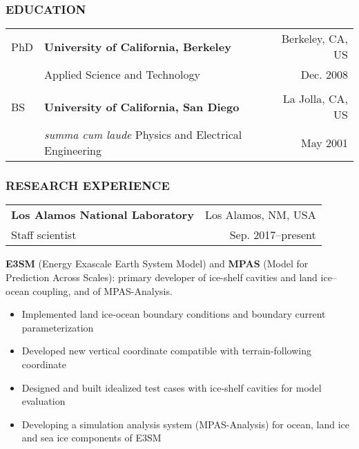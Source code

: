 \documentclass[12pt,letterpaper]{article}
\begin{document}
\begin{flushleft}
\subsubsection*{\color{titleBlue} EDUCATION}

\begin{tabularx}{\textwidth}{@{}  l X r @{} }
PhD & {\bf University of California, Berkeley} & Berkeley, CA, US\\
& Applied Science and Technology & Dec. 2008 \\
\\
BS & {\bf University of California, San Diego} & La Jolla, CA, US \\
& {\it summa cum laude} Physics and Electrical Engineering & May 2001\\
\end{tabularx}

\subsubsection*{\color{titleBlue} RESEARCH EXPERIENCE}

\begin{tabularx}{\textwidth}{@{} X r @{}}
{\bf Los Alamos National Laboratory} &  Los Alamos, NM, USA \\
Staff scientist  &   Sep. 2017--present \\
\end{tabularx}

\vspace{4pt}

\textbf{E3SM} (Energy Exascale Earth System Model) and \textbf{MPAS} (Model for Prediction Across Scales): primary developer of ice-shelf cavities and land ice--ocean coupling, and of MPAS-Analysis.

\begin{itemize}[noitemsep,nolistsep]
  \item Implemented land ice-ocean boundary conditions and boundary current parameterization
  \item Developed new vertical coordinate compatible with terrain-following coordinate 
  \item Designed and built idealized test cases with ice-shelf cavities for model evaluation
  \item Developing a simulation analysis system (MPAS-Analysis) for ocean, land ice and sea ice components of E3SM
\end{itemize}
\vspace{4pt}


\end{flushleft}
\end{document}
